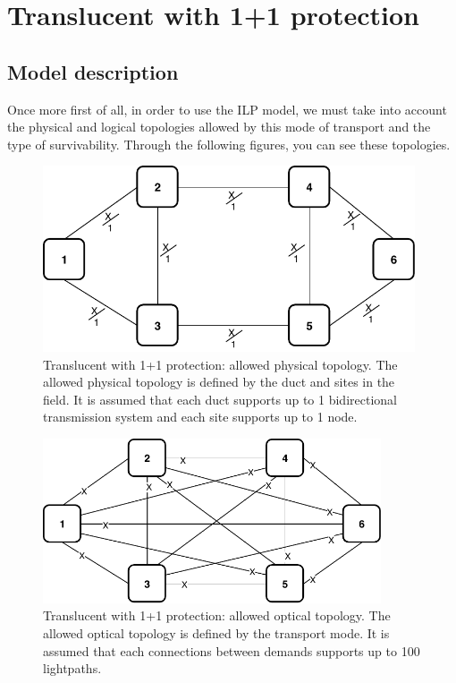 
\section{Translucent with 1+1 protection}\label{ILP_Transluc_Protection}

\subsection{Model description}

Once more first of all, in order to use the ILP model, we must take into account the physical and logical topologies allowed by this mode of transport and the type of survivability. Through the following figures, you can see these topologies.

\begin{figure}[h!]
\centering
\includegraphics[width=11cm]{sdf/ilp/translucent_protection/figures/allowed_physical_topology}
\caption{Translucent with 1+1 protection: allowed physical topology. The allowed physical topology is defined by the duct and sites in the field. It is assumed that each duct supports up to 1 bidirectional transmission system and each site supports up to 1 node.}
\label{allowed3_physical_protectionlow}
\end{figure}

\newpage
\begin{figure}[h!]
\centering
\includegraphics[width=10cm]{sdf/ilp/translucent_protection/figures/allowed_optical_topology}
\caption{Translucent with 1+1 protection: allowed optical topology. The allowed optical topology is defined by the transport mode. It is assumed that each connections between demands supports up to 100 lightpaths.}
\label{allowed3_optical_protectionlow}
\end{figure}

